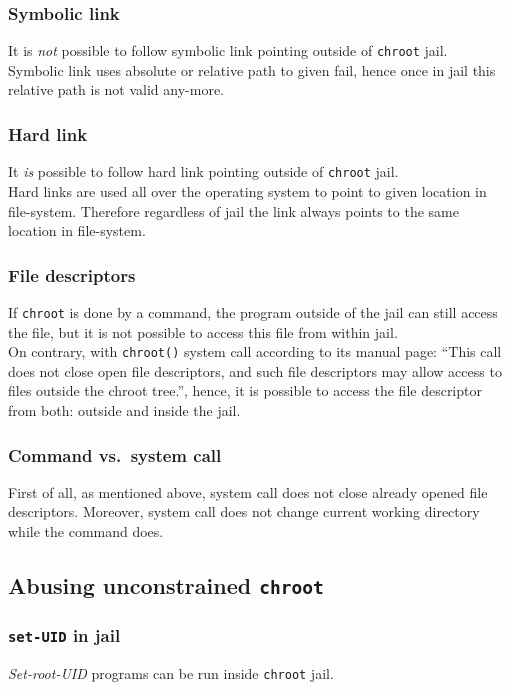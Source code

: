 \documentclass[12pt, a4paper, pdflatex]{article}
\begin{document}
\subsubsection{Symbolic link}
It is \emph{not} possible to follow symbolic link pointing outside of \texttt{chroot} jail.\\
Symbolic link uses absolute or relative path to given fail, hence once in jail this relative path is not valid any-more.

\subsubsection{Hard link}
It \emph{is} possible to follow hard link pointing outside of \texttt{chroot} jail.\\
Hard links are used all over the operating system to point to given location in file-system. Therefore regardless of jail the link always points to the same location in file-system.

\subsubsection{File descriptors}
If \texttt{chroot} is done by a command, the program outside of the jail can still access the file, but it is not possible to access this file from within jail.\\
On contrary, with \texttt{chroot()} system call according to its manual page: ``This call does not close open file descriptors, and such file descriptors may allow access to files outside the chroot tree.'', hence, it is possible to access the file descriptor from both: outside and inside the jail.

\subsubsection{Command vs.\ system call}
First of all, as mentioned above, system call does not close already opened file descriptors. Moreover, system call does not change current working directory while the command does.

\subsection{Abusing unconstrained \texttt{chroot}}
\subsubsection{\texttt{set-UID} in jail}
\emph{Set-root-UID} programs can be run inside \texttt{chroot} jail.
\end{document}
